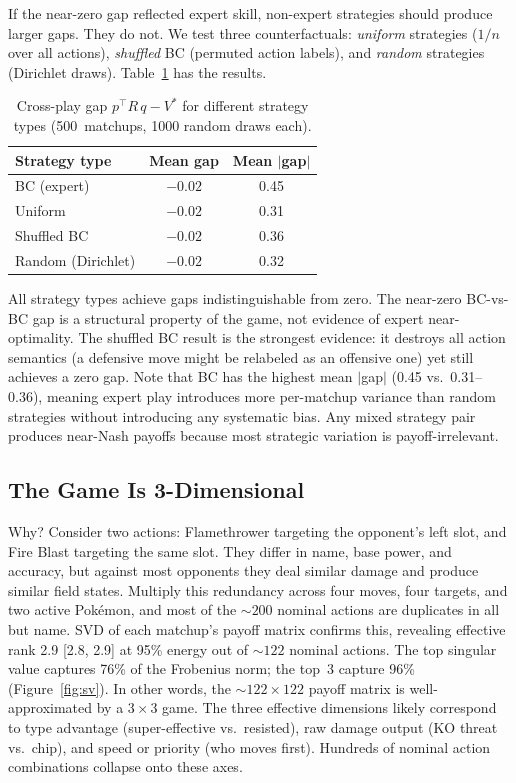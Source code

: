 \documentclass{article}
\begin{document}
If the near-zero gap reflected expert skill, non-expert strategies should produce larger gaps. They do not. We test three counterfactuals: \emph{uniform} strategies ($1/n$ over all actions), \emph{shuffled} BC (permuted action labels), and \emph{random} strategies (Dirichlet draws). Table~\ref{tab:counterfactual} has the results.

\begin{table}[t]
\caption{Cross-play gap $p^\top R\, q - V^*$ for different strategy types (500~matchups, 1000 random draws each).}
\label{tab:counterfactual}
\vskip 0.1in
\centering
\small
\begin{tabular}{lcc}
\toprule
Strategy type & Mean gap & Mean $|$gap$|$ \\
\midrule
BC (expert) & $-0.02$ & 0.45 \\
Uniform & $-0.02$ & 0.31 \\
Shuffled BC & $-0.02$ & 0.36 \\
Random (Dirichlet) & $-0.02$ & 0.32 \\
\bottomrule
\end{tabular}
\vskip -0.1in
\end{table}

All strategy types achieve gaps indistinguishable from zero. The near-zero BC-vs-BC gap is a structural property of the game, not evidence of expert near-optimality. The shuffled BC result is the strongest evidence: it destroys all action semantics (a defensive move might be relabeled as an offensive one) yet still achieves a zero gap. Note that BC has the highest mean $|$gap$|$ (0.45 vs.\ 0.31--0.36), meaning expert play introduces more per-matchup variance than random strategies without introducing any systematic bias. Any mixed strategy pair produces near-Nash payoffs because most strategic variation is payoff-irrelevant.

\subsection{The Game Is 3-Dimensional}

Why? Consider two actions: Flamethrower targeting the opponent's left slot, and Fire Blast targeting the same slot. They differ in name, base power, and accuracy, but against most opponents they deal similar damage and produce similar field states. Multiply this redundancy across four moves, four targets, and two active Pok\'emon, and most of the ${\sim}200$ nominal actions are duplicates in all but name. SVD of each matchup's payoff matrix confirms this, revealing effective rank 2.9 [2.8, 2.9] at 95\% energy out of ${\sim}122$ nominal actions. The top singular value captures 76\% of the Frobenius norm; the top~3 capture 96\% (Figure~\ref{fig:sv}). In other words, the ${\sim}122 \times 122$ payoff matrix is well-approximated by a $3 \times 3$ game. The three effective dimensions likely correspond to type advantage (super-effective vs.\ resisted), raw damage output (KO threat vs.\ chip), and speed or priority (who moves first). Hundreds of nominal action combinations collapse onto these axes.
\end{document}
